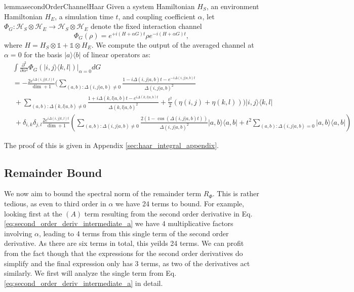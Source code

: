 \documentclass{article}
\newcommand{\ketbra}[2]{| #1\rangle\! \langle #2|}
\newcommand{\parens}[1]{\left( #1 \right)}
\newcommand{\hilb}{\mathcal{H}}
\newcommand{\identity}{\mathds{1}}
\begin{document}
\begin{restatable}{lemma}{secondOrderChannelHaar} \label{lem:big_one}
    Given a system Hamiltonian $H_{S}$, an environment Hamiltonian $H_{E}$, a simulation time $t$, and coupling coefficient $\alpha$, let $\Phi_G : \hilb_S \otimes \hilb_E \to \hilb_S \otimes \hilb_E$ denote the fixed interaction channel 
    \begin{equation}
        \Phi_G(\rho) = e^{+i (H + \alpha G)t} \rho e^{-i (H + \alpha G)t},
    \end{equation}
    where $H = H_S \otimes \identity + \identity \otimes H_E$. We compute the output of the averaged channel at $\alpha = 0$ for the basis $\ketbra{a}{b}$ of linear operators as:
 \begin{align}
     &\int \frac{\partial^2}{\partial \alpha^2} \Phi_G(\ketbra{i,j}{k,l})\bigg|_{\alpha = 0} dG \\
     &= -\frac{2  e^{i \Delta(i,j|k,l) t}}{\dim + 1} \bigg(\sum_{(a,b): \Delta(i,j|a,b) \neq 0} \frac{1 - i \Delta(i,j|a,b)t - e^{-i \Delta(i,j|a,b) t}}{\Delta(i,j|a,b)^2} \nonumber \\
     &~+ \sum_{(a,b): \Delta(k,l|a,b) \neq 0} \frac{1 + i \Delta(k,l|a,b) t - e^{i \Delta(k,l|a,b) t}}{\Delta(k,l|a,b)^2} + \frac{t^2}{2}(\eta(i,j) + \eta(k,l)) \bigg) \ketbra{i,j}{k,l} \nonumber \\
    &~ +\delta_{i,k} \delta_{j,l} \frac{2 e^{i \Delta(i,j|k,l)t}}{\dim+1} \parens{ \sum_{(a,b): \Delta(i,j|a,b) \neq 0 } \frac{2(1- \cos (\Delta(i,j|a,b)t))}{\Delta(i,j|a,b)^2} \ketbra{a,b}{a,b} + t^2 \sum_{(a,b) : \Delta(i,j|a,b) = 0} \ketbra{a,b}{a,b}}
 \end{align}
\end{restatable}
The proof of this is given in Appendix \ref{sec:haar_integral_appendix}. 



\subsection{Remainder Bound}
We now aim to bound the spectral norm of the remainder term $R_{\Phi}$. This is rather tedious, as even to third order in $\alpha$ we have 24 terms to bound. For example, looking first at the $(A)$ term resulting from the second order derivative in Eq. \eqref{eq:second_order_deriv_intermediate_a} we have 4 multiplicative factors involving $\alpha$, leading to 4 terms from this single term of the second order derivative. As there are six terms in total, this yeilds 24 terms. We can profit from the fact though that the expressions for the second order derivatives do simplify and the final expression only has 3 terms, as two of the derivatives act similarly. We first will analyze the single term from Eq. \eqref{eq:second_order_deriv_intermediate_a} in detail. 
\end{document}
